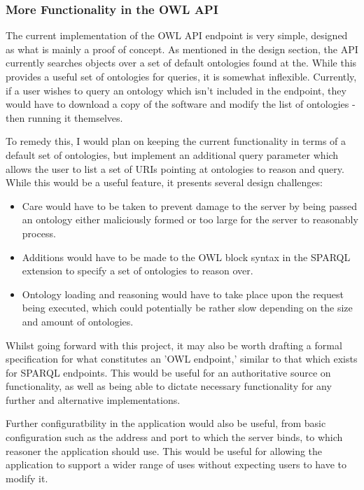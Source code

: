 \documentclass{article}
\begin{document}
\subsubsection{More Functionality in the OWL API}

The current implementation of the OWL API endpoint is very simple, designed as
what is mainly a proof of concept. As mentioned in the design
section, the API currently searches objects over a set of default ontologies
found at the\cite{obofoundry}. While this provides a useful set of
ontologies for queries, it is somewhat inflexible. Currently, if a user wishes
to query an ontology which isn't included in the endpoint, they
would have to download a copy of the software and modify the list of ontologies
- then running it themselves.

To remedy this, I would plan on keeping the current functionality in terms of a
default set of ontologies, but implement an additional query
parameter which allows the user to list a set of URIs pointing at ontologies to
reason and query. While this would be a useful feature, it
presents several design challenges: 

\begin{itemize}
    \item Care would have to be taken to prevent damage to the server by being
    passed an ontology either maliciously formed or too large for the server to
    reasonably process.
    \item Additions would have to be made to the OWL block syntax in the SPARQL
    extension to specify a set of ontologies to reason over.
    \item Ontology loading and reasoning would have to take place upon the
    request being executed, which could potentially be rather slow depending on
    the size and amount of ontologies.
\end{itemize}

Whilst going forward with this project, it may also be worth drafting a formal
specification for what constitutes an 'OWL endpoint,' similar
to that which exists for SPARQL endpoints. This would be useful for an
authoritative source on functionality, as well as being able
to dictate necessary functionality for any further and alternative
implementations.

Further configuratbility in the application would also be useful, from basic
configuration such as the address and port to which the server binds, to which
reasoner the application should use. This would be useful for allowing the
application to support a wider range of uses without expecting users to have to
modify it.
\end{document}
